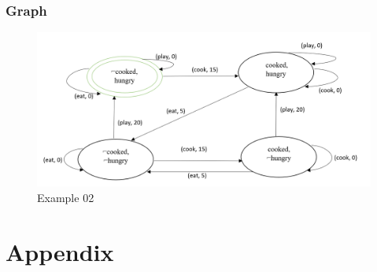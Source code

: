 \documentclass[11pt]{article}
\begin{document}
	\subsubsection{Graph}\label{par:p403}
	\begin{figure}[H]
		\includegraphics[width=1\linewidth, height=0.3\textheight]{./media/figure01.png}
		\caption{Example 02}
		\label{Figure:f03}
	\end{figure}
	\newpage
	\section{Appendix}	
	\begin{appendix}
		\listoffigures
		\listoftables
	\end{appendix}
\end{document}
